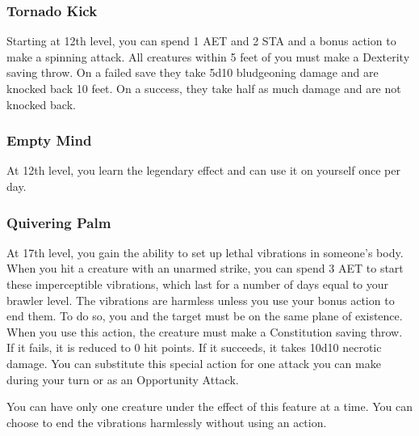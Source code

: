 \subsubsection{Tornado Kick}
Starting at 12th level, you can spend 1 AET and 2 STA and a bonus action to make a spinning attack. All creatures within 5 feet of you must make a Dexterity saving throw. On a failed save they take 5d10 bludgeoning damage and are knocked back 10 feet. On a success, they take half as much damage and are not knocked back.

\subsubsection{Empty Mind}
At 12th level, you learn the legendary effect  and can use it on yourself once per day.

\subsubsection{Quivering Palm}

At 17th level, you gain the ability to set up lethal vibrations in someone's body. When you hit a creature with an unarmed strike, you can spend 3 AET to start these imperceptible vibrations, which last for a number of days equal to your brawler level. The vibrations are harmless unless you use your bonus action to end them. To do so, you and the target must be on the same plane of existence. When you use this action, the creature must make a Constitution saving throw. If it fails, it is reduced to 0 hit points. If it succeeds, it takes 10d10 necrotic damage. You can substitute this special action for one attack you can make during your turn or as an Opportunity Attack.

You can have only one creature under the effect of this feature at a time. You can choose to end the vibrations harmlessly without using an action.


